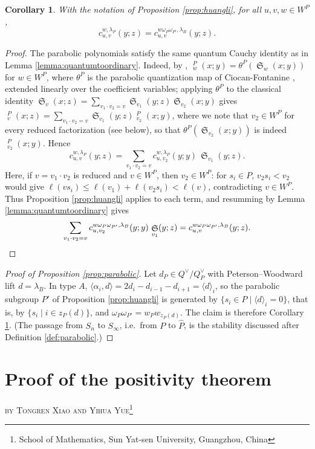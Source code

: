 \documentclass{amsart}
\newtheorem{corollary}[lemma]{Corollary}
\theoremstyle{definition}
\theoremstyle{remark}
\numberwithin{equation}{section}
\DeclareMathOperator{\sch}{\mathfrak{S}}
\DeclareMathOperator{\qsch}{\widetilde{\mathfrak{S}}}
\newcommand{\pcomp}[1]{\widehat{#1}}
\begin{document}
\begin{corollary} \label{corollary:pwz}
With the notation of Proposition \ref{prop:huangli}, for all $u,v,w\in W^P$,
$$c_{u,v}^{w,\lambda_P}(y;z) = c_{u,v}^{w\omega_P\omega_{P'},\lambda_B}(y;z).$$
\end{corollary}
\begin{proof}
The parabolic polynomials satisfy the same quantum Cauchy identity as in Lemma \ref{lemma:quantumtoordinary}. Indeed, by \cite[Lemma~18]{lam2014quantum}, $\qsch^P_w(x;y)=\theta^P(\sch_w(x;y))$ for $w\in W^P$, where $\theta^P$ is the parabolic quantization map of Ciocan-Fontanine \cite{ciocan1999partial}, extended linearly over the coefficient variables; applying $\theta^P$ to the classical identity $\sch_v(x;z)=\sum_{v_1\cdot v_2=v}\sch_{v_1}(y;z)\sch_{v_2}(x;y)$ gives $\qsch^P_v(x;z)=\sum_{v_1\cdot v_2=v}\sch_{v_1}(y;z)\qsch^P_{v_2}(x;y)$, where we note that $v_2\in W^P$ for every reduced factorization (see below), so that $\theta^P(\sch_{v_2}(x;y))$ is indeed $\qsch^P_{v_2}(x;y)$. Hence
$$c_{u,v}^{w,\lambda_P}(y;z) = \sum_{v_1\cdot v_2=v}c_{u,v_2}^{w,\lambda_P}(y;y)\,\sch_{v_1}(y;z).$$
Here, if $v=v_1\cdot v_2$ is reduced and $v\in W^P$, then $v_2\in W^P$: for $s_i\in P$, $v_2s_i<v_2$ would give $\ell(vs_i)\leq\ell(v_1)+\ell(v_2s_i)<\ell(v)$, contradicting $v\in W^P$. Thus Proposition \ref{prop:huangli} applies to each term, and resumming by Lemma \ref{lemma:quantumtoordinary} gives
$$\sum_{v_1\cdot v_2=v}c_{u,v_2}^{w\omega_P\omega_{P'},\lambda_B}(y;y)\,\sch_{v_1}(y;z) = c_{u,v}^{w\omega_P\omega_{P'},\lambda_B}(y;z).\qedhere$$
\end{proof}

\begin{proof}[Proof of Proposition \ref{prop:parabolic}]
Let $d_P\in Q^\vee/Q^\vee_P$ with Peterson--Woodward lift $d=\lambda_B$. In type $A$, $\langle\alpha_i,d\rangle=2d_i-d_{i-1}-d_{i+1}=\langle d\rangle_i$, so the parabolic subgroup $P'$ of Proposition \ref{prop:huangli} is generated by $\{s_i\in P\mid\langle d\rangle_i=0\}$, that is, by $\{s_i\mid i\in z_P(d)\}$, and $\omega_P\omega_{P'}=w_Pw_{z_P(d)}$. The claim is therefore Corollary \ref{corollary:pwz}. (The passage from $S_n$ to $S_\infty$, i.e.\ from $P$ to $\pcomp P$, is the stability discussed after Definition \ref{def:parabolic}.)
\end{proof}

\appendix
\section{Proof of the positivity theorem} \label{appendix:positivity}
\begin{center}
\textsc{by Tongren Xiao and Yihua Yue}\footnote{School of Mathematics, Sun Yat-sen University, Guangzhou, China}
\end{center}
\end{document}
